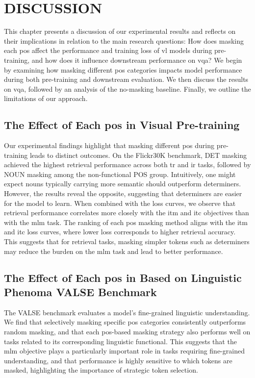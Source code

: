 \chapter{DISCUSSION}
This chapter presents a discussion of our experimental results and reflects on their implications in relation to the main research questions: How does masking each \acrshort{pos} affect the performance and training loss of \acrshort{vl} models during pre-training, and how does it influence downstream performance on \acrshort{vqa}?
We begin by examining how masking different \acrshort{pos} categories impacts model performance during both pre-training and downstream evaluation.
We then discuss the results on \acrshort{vqa}, followed by an analysis of the no-masking baseline.
Finally, we outline the limitations of our approach.

\section{The Effect of Each \acrshort{pos} in Visual Pre-training}
Our experimental findings highlight that masking different \acrshort{pos} during pre-training leads to distinct outcomes.
On the Flickr30K benchmark, DET masking achieved the highest retrieval performance across both \acrshort{tr} and \acrshort{ir} tasks, followed by NOUN masking among the non-functional POS group.
Intuitively, one might expect nouns typically carrying more semantic should outperform determiners.
However, the results reveal the opposite, suggesting that determiners are easier for the model to learn.
When combined with the loss curves, we observe that retrieval performance correlates more closely with the \acrshort{itm} and \acrshort{itc} objectives than with the \acrshort{mlm} task.
The ranking of each \acrshort{pos} masking method aligns with the \acrshort{itm} and \acrshort{itc} loss curves, where lower loss corresponds to higher retrieval accuracy.
This suggests that for retrieval tasks, masking simpler tokens such as determiners may reduce the burden on the \acrshort{mlm} task and lead to better performance.

\section{The Effect of Each \acrshort{pos} in Based on Linguistic Phenoma VALSE Benchmark}
The VALSE benchmark evaluates a model’s fine-grained linguistic understanding.
We find that selectively masking specific \acrshort{pos} categories consistently outperforms random masking, and that each \acrshort{pos}-based masking strategy also performs well on tasks related to its corresponding linguistic functional.
This suggests that the \acrshort{mlm} objective plays a particularly important role in tasks requiring fine-grained understanding, and that performance is highly sensitive to which tokens are masked, highlighting the importance of strategic token selection.

